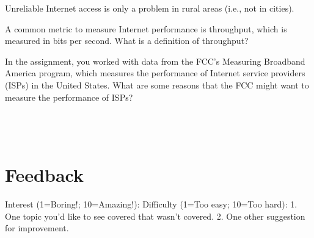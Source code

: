Unreliable Internet access is only a problem in rural areas (i.e., not in cities).
\yesnono
\eprob

A common metric to measure Internet performance is throughput, which is
measured in bits per second. What is a definition of throughput?  \\
\eprob

In the assignment, you worked with data from the FCC's Measuring Broadband
America program, which measures the performance of Internet service providers
(ISPs) in the United States.  What are some reasons that the FCC might want to
measure the performance of ISPs?\\
\\
\\
\\
\eprob

\pagebreak
\section*{Feedback}
\vspace*{-0.1in}
Interest (1=Boring!; 10=Amazing!):
Difficulty (1=Too easy; 10=Too hard):
\eprob
{}
1. One topic you'd like to see covered that wasn't covered. 2. One other suggestion for
improvement.

\eprob

